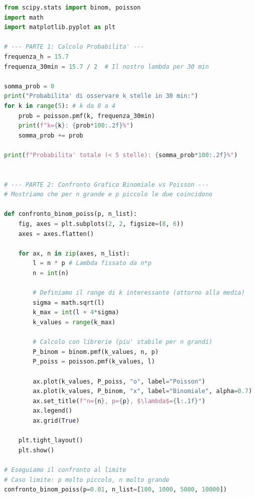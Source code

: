 \documentclass[openany,a4paper,12pt]{book}
\theoremstyle{remark}
\begin{document}
\begin{lstlisting}[language=Python, frame=single, caption={Calcolo Poisson e confronto con Binomiale}]
from scipy.stats import binom, poisson
import math
import matplotlib.pyplot as plt

# --- PARTE 1: Calcolo Probabilita' ---
frequenza_h = 15.7
frequenza_30min = 15.7 / 2  # Il nostro lambda per 30 min

somma_prob = 0
print("Probabilita' di osservare k stelle in 30 min:")
for k in range(5): # k da 0 a 4
    prob = poisson.pmf(k, frequenza_30min)
    print(f"k={k}: {prob*100:.2f}%")
    somma_prob += prob

print(f"Probabilita' totale (< 5 stelle): {somma_prob*100:.2f}%")


# --- PARTE 2: Confronto Grafico Binomiale vs Poisson ---
# Mostriamo che per n grande e p piccolo le due coincidono

def confronto_binom_poiss(p, n_list):
    fig, axes = plt.subplots(2, 2, figsize=(8, 6))
    axes = axes.flatten()

    for ax, n in zip(axes, n_list):
        l = n * p # Lambda fissato da n*p
        n = int(n)
        
        # Definiamo il range di k interessante (attorno alla media)
        sigma = math.sqrt(l)
        k_max = int(l + 4*sigma)
        k_values = range(k_max)

        # Calcolo con librerie (piu' stabile per n grandi)
        P_binom = binom.pmf(k_values, n, p)
        P_poiss = poisson.pmf(k_values, l)

        ax.plot(k_values, P_poiss, "o", label="Poisson")
        ax.plot(k_values, P_binom, "x", label="Binomiale", alpha=0.7)
        ax.set_title(f"n={n}, p={p}, $\lambda$={l:.1f}")
        ax.legend()
        ax.grid(True)
    
    plt.tight_layout()
    plt.show()

# Eseguiamo il confronto al limite
# Caso limite: p molto piccolo, n molto grande
confronto_binom_poiss(p=0.01, n_list=[100, 1000, 5000, 10000])
\end{lstlisting}
\end{document}
